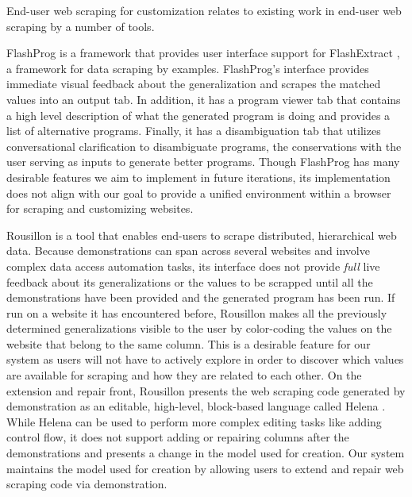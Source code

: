 \documentclass[sigconf,10pt]{acmart}
\begin{document}
End-user web scraping for customization relates to existing work in
end-user web scraping by a number of tools.

FlashProg \citep{mayer2015} is a framework that provides user interface
support for FlashExtract \citep{le2014}, a framework for data scraping
by examples. FlashProg's interface provides immediate visual feedback
about the generalization and scrapes the matched values into an output
tab. In addition, it has a program viewer tab that contains a high level
description of what the generated program is doing and provides a list
of alternative programs. Finally, it has a disambiguation tab that
utilizes conversational clarification to disambiguate programs, the
conservations with the user serving as inputs to generate better
programs. Though FlashProg has many desirable features we aim to
implement in future iterations, its implementation does not align with
our goal to provide a unified environment within a browser for scraping
and customizing websites.

Rousillon \citep{chasins2018} is a tool that enables end-users to scrape
distributed, hierarchical web data. Because demonstrations can span
across several websites and involve complex data access automation
tasks, its interface does not provide \emph{full} live feedback about
its generalizations or the values to be scrapped until all the
demonstrations have been provided and the generated program has been
run. If run on a website it has encountered before, Rousillon makes all
the previously determined generalizations visible to the user by
color-coding the values on the website that belong to the same column.
This is a desirable feature for our system as users will not have to
actively explore in order to discover which values are available for
scraping and how they are related to each other. On the extension and
repair front, Rousillon presents the web scraping code generated by
demonstration as an editable, high-level, block-based language called
Helena \citep{zotero-1349}. While Helena can be used to perform more
complex editing tasks like adding control flow, it does not support
adding or repairing columns after the demonstrations and presents a
change in the model used for creation. Our system maintains the model
used for creation by allowing users to extend and repair web scraping
code via demonstration.
\end{document}
